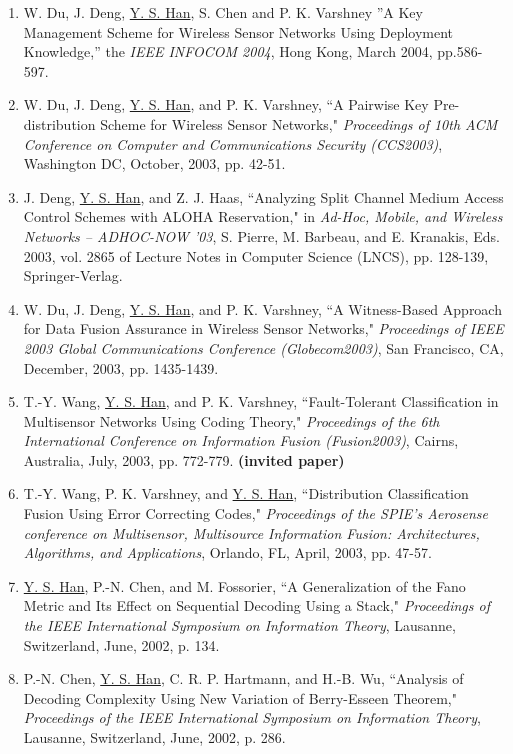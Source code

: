 \begin{llist}
\begin{itemize}
\begin{enumerate}
\item W. Du, J. Deng, \underline{Y. S. Han}, S. Chen and P. K.
Varshney ''A Key Management Scheme for Wireless Sensor Networks
Using Deployment Knowledge,'' the {\it IEEE INFOCOM 2004}, Hong
Kong, March 2004, pp.586-597.

 \item W. Du, J. Deng, \underline{Y. S. Han}, and P. K.
Varshney, ``A Pairwise Key Pre-distribution Scheme for Wireless
Sensor Networks," {\it Proceedings of 10th ACM Conference on
Computer and Communications
 Security (CCS2003)}, Washington DC,  October, 2003, pp. 42-51.
\item J. Deng, \underline{Y. S. Han}, and Z. J. Haas, ``Analyzing
Split Channel Medium Access Control Schemes with ALOHA
Reservation,"  in {\it Ad-Hoc, Mobile, and Wireless Networks --
ADHOC-NOW '03}, S. Pierre, M. Barbeau, and E. Kranakis, Eds. 2003,
vol. 2865 of Lecture Notes in Computer Science (LNCS), pp.
128-139, Springer-Verlag.

\item W. Du, J. Deng, \underline{Y. S. Han}, and P. K. Varshney,
``A Witness-Based Approach for Data Fusion Assurance in Wireless
Sensor Networks," {\it Proceedings of IEEE 2003 Global
Communications Conference (Globecom2003)}, San Francisco, CA,
December, 2003, pp. 1435-1439.
 \item T.-Y. Wang, \underline{Y. S. Han},
and P. K. Varshney, ``Fault-Tolerant Classification in Multisensor
Networks Using Coding Theory," {\it Proceedings of the 6th
International Conference on Information Fusion (Fusion2003)},
Cairns, Australia, July, 2003, pp. 772-779. {\bf (invited paper)}

\item T.-Y. Wang, P. K. Varshney, and \underline{Y. S. Han},
``Distribution Classification Fusion Using Error Correcting
Codes," {\it Proceedings of the SPIE's Aerosense  conference on
Multisensor, Multisource Information Fusion: Architectures,
Algorithms, and Applications}, Orlando, FL,  April, 2003, pp.
47-57.

\item \underline{Y. S. Han}, P.-N. Chen, and M. Fossorier, ``A
Generalization of the Fano Metric and Its Effect on Sequential
Decoding Using a Stack," {\it Proceedings of the  IEEE
International Symposium on Information Theory}, Lausanne,
Switzerland, June, 2002, p. 134.

\item P.-N. Chen, \underline{Y. S. Han}, C. R. P. Hartmann, and
H.-B. Wu, ``Analysis of Decoding Complexity Using New Variation of
Berry-Esseen Theorem," {\it Proceedings of the  IEEE International
Symposium on Information Theory},  Lausanne, Switzerland, June,
2002, p. 286.


\end{enumerate}
\end{itemize}
\end{llist}
